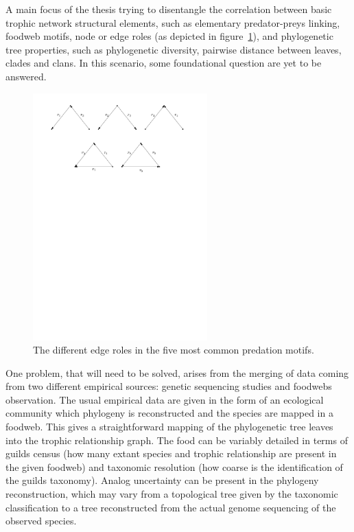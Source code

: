 \documentclass[12pt,a4paper]{report}
\begin{document}
A main focus of the thesis trying to disentangle the correlation between basic trophic network structural elements, such as elementary predator-preys linking, foodweb motifs, node or edge roles (as depicted in figure~\ref{fig:motifs}), and phylogenetic tree properties, such as phylogenetic diversity, pairwise distance between leaves, clades and clans. In this scenario, some foundational question are yet to be answered.

\begin{figure}[h]
	\centering
		\includegraphics[width=0.6\textwidth]{images/motifs}
		\caption{The different edge roles in the five most common predation motifs.}
		\label{fig:motifs}
\end{figure}


One problem, that will need to be solved, arises from the merging of data coming from two different empirical sources: genetic sequencing studies and foodwebs observation. The usual empirical data are given in the form of an ecological community which phylogeny is reconstructed and the species are mapped in a foodweb. This gives a straightforward mapping of the phylogenetic tree leaves into the trophic relationship graph. The food can be variably detailed in terms of guilds census (how many extant species and trophic relationship are present in the given foodweb) and taxonomic resolution (how coarse is the identification of the guilds taxonomy). Analog uncertainty can be present in the phylogeny reconstruction, which may vary from a topological tree given by the taxonomic classification to a tree reconstructed from the actual genome sequencing of the observed species.
\end{document}
